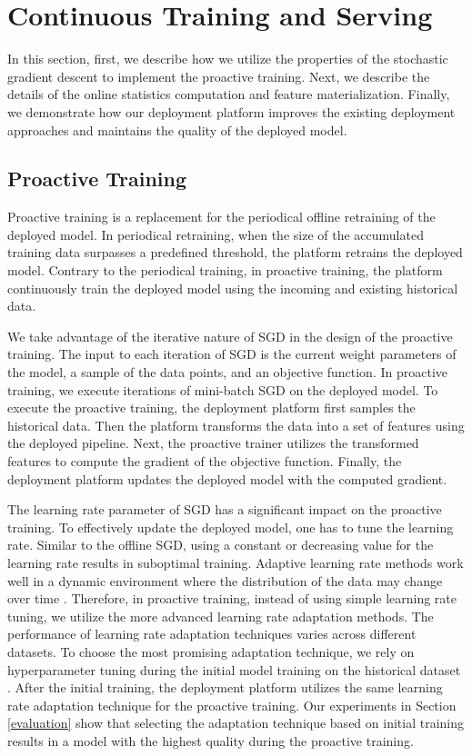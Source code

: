 \section{Continuous Training and Serving} \label{continuous-training-serving}
In this section, first, we describe how we utilize the properties of the stochastic gradient descent to implement the proactive training.
Next, we describe the details of the online statistics computation and feature materialization.
Finally, we demonstrate how our deployment platform improves the existing deployment approaches and maintains the quality of the deployed model.

\subsection{Proactive Training} \label{proactive-training}
Proactive training is a replacement for the periodical offline retraining of the deployed model.
In periodical retraining, when the size of the accumulated training data surpasses a predefined threshold, the platform retrains the deployed model.
Contrary to the periodical training, in proactive training, the platform continuously train the deployed model using the incoming and existing historical data.

We take advantage of the iterative nature of SGD in the design of the proactive training.
The input to each iteration of SGD is the current weight parameters of the model, a sample of the data points, and an objective function.
In proactive training, we execute iterations of mini-batch SGD on the deployed model.
To execute the proactive training, the deployment platform first samples the historical data.
Then the platform transforms the data into a set of features using the deployed pipeline.
Next, the proactive trainer utilizes the transformed features to compute the gradient of the objective function.
Finally, the deployment platform updates the deployed model with the computed gradient.

The learning rate parameter of SGD has a significant impact on the proactive training.
To effectively update the deployed model, one has to tune the learning rate.
Similar to the offline SGD, using a constant or decreasing value for the learning rate results in suboptimal training.
Adaptive learning rate methods work well in a dynamic environment where the distribution of the data may change over time \cite{zeiler2012adadelta}.
Therefore, in proactive training, instead of using simple learning rate tuning, we utilize the more advanced learning rate adaptation methods.
The performance of learning rate adaptation techniques varies across different datasets.
To choose the most promising adaptation technique, we rely on hyperparameter tuning during the initial model training on the historical dataset \cite{bergstra2012random}.
After the initial training, the deployment platform utilizes the same learning rate adaptation technique for the proactive training.
Our experiments in Section \ref{evaluation} show that selecting the adaptation technique based on initial training results in a model with the highest quality during the proactive training.

